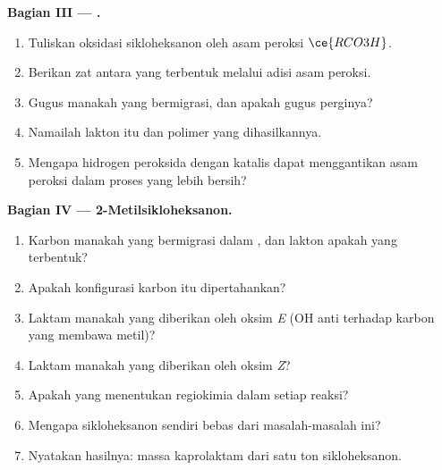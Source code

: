\begin{problem}
\medskip\noindent\textbf{Bagian III --- .}
\begin{enumerate}[resume, beginpenalty=10000]
  \item Tuliskan oksidasi sikloheksanon oleh asam peroksi $\ce{RCO3H}$.
  \item Berikan zat antara yang terbentuk melalui adisi asam peroksi.
  \item Gugus manakah yang bermigrasi, dan apakah gugus perginya?
  \item Namailah lakton itu dan polimer yang dihasilkannya.
  \item Mengapa hidrogen peroksida dengan katalis dapat menggantikan asam peroksi dalam
        proses yang lebih bersih?
\end{enumerate}

\medskip\noindent\textbf{Bagian IV --- 2-Metilsikloheksanon.}
\begin{enumerate}[resume, beginpenalty=10000]
  \item Karbon manakah yang bermigrasi dalam , dan lakton apakah yang terbentuk?
  \item Apakah konfigurasi karbon itu dipertahankan?
  \item Laktam manakah yang diberikan oleh oksim \textit{E} (OH anti terhadap karbon yang membawa metil)?
  \item Laktam manakah yang diberikan oleh oksim \textit{Z}?
  \item Apakah yang menentukan regiokimia dalam setiap reaksi?
  \item Mengapa sikloheksanon sendiri bebas dari masalah-masalah ini?
  \item Nyatakan hasilnya: massa kaprolaktam dari satu ton sikloheksanon.
\end{enumerate}
\end{problem}
